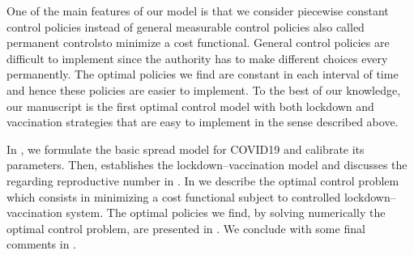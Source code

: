     One of the main features of our model is that we consider piecewise
constant control policies instead of general measurable control policies
\textemdash also called permanent controls\textemdash to minimize a cost 
functional. General control policies are difficult to implement since the 
authority has to make different choices every permanently. The optimal policies 
we find are constant in each interval of time and hence these policies are 
easier to implement. To the best of our knowledge, our manuscript is the first 
optimal control model with both lockdown and vaccination strategies that are 
easy to implement in the sense described above. 


In , we formulate the
basic spread model for COVID19 and calibrate its parameters. Then,
 establishes the lockdown--vaccination model and
discusses the regarding reproductive number in
. 
In  we describe the optimal control problem 
which consists in minimizing a cost functional subject to controlled 
lockdown--vaccination system. The optimal policies we find, by solving 
numerically the optimal control problem, are presented in 
. We conclude with some final comments in 
.